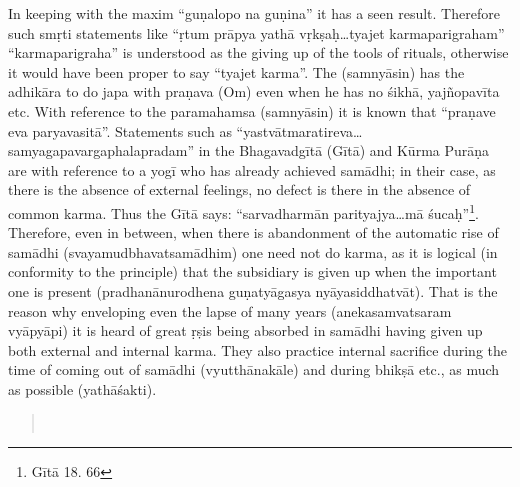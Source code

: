 In keeping with the maxim “guṇalopo na guṇina” it has a seen result. Therefore such smṛti statements like “ṛtum prāpya yathā vṛkṣaḥ…tyajet karmaparigraham” “karmaparigraha” is understood as the giving up of the tools of rituals, otherwise it would have been proper to say “tyajet karma”. The (samnyāsin) has the adhikāra to do japa with praṇava (Om) even when he has no śikhā, yajñopavīta etc.  With reference to the paramahamsa (samnyāsin) it is known that “praṇave eva paryavasitā”. Statements such as “yastvātmaratireva… samyagapavargaphalapradam” in the Bhagavadgītā (Gītā) and Kūrma Purāṇa are with reference to a yogī who has already achieved samādhi; in their case, as there is the absence of external feelings, no defect is there in the absence of common karma. Thus the Gītā says: “sarvadharmān parityajya…mā śucaḥ”\footnote{Gītā 18. 66}. Therefore, even in between, when there is abandonment of the automatic rise of samādhi (svayamudbhavatsamādhim) one need not do karma, as it is logical (in conformity to the principle) that the subsidiary is given up when the important one is present (pradhanānurodhena guṇatyāgasya nyāyasiddhatvāt). That is the reason why enveloping even the lapse of many years (anekasamvatsaram vyāpyāpi) it is heard of great ṛṣis being absorbed in samādhi having given up both external and internal karma. They also practice internal sacrifice during the time of coming out of samādhi (vyutthānakāle) and during bhikṣā etc., as much as possible (yathāśakti).

\begin{verse}
\\
\end{verse}

